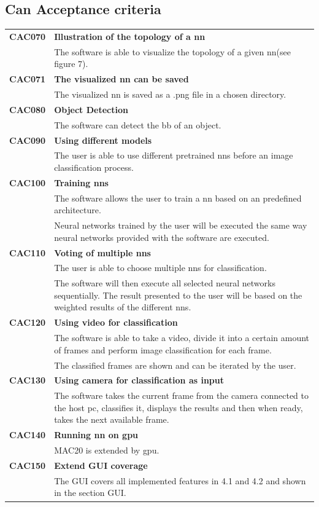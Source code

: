 \documentclass[parskip=full]{scrartcl}
\begin{document}
\subsection{Can Acceptance criteria}
\begin{tabular}{p{2cm}p{12cm}}
\textbf{CAC070} & \textbf{Illustration of the topology of a \gls{nn}} \\
& The software is able to visualize the topology of a given \gls{nn}(see figure 7). \\
\textbf{CAC071} & \textbf{The visualized nn can be saved}\\
& The visualized \gls{nn} is saved as a .png file in a chosen directory.\\
\textbf{CAC080} & \textbf{Object Detection} \\
& The software can detect the \gls{bb} of an object. \\ 
\textbf{CAC090} &  \textbf{Using different models}\\
& The user is able to use different pretrained \glspl{nn} before an \gls{image classification} process. \\
\textbf{CAC100} & \textbf{Training \glspl{nn}} \\
& The software allows the user to train a \gls{nn} based on an predefined architecture.\\
& Neural networks trained by the user will be executed the same way neural networks provided with the software are executed.\\
\textbf{CAC110} & \textbf{Voting of multiple \glspl{nn}} \\
& The user is able to choose multiple \glspl{nn} for classification.\\
& The software will then execute all selected neural networks sequentially. The result presented to the user will be based on the weighted results of the different \glspl{nn}.\\
\textbf{CAC120} & \textbf{Using video for classification} \\
& The software is able to take a video, divide it into a certain amount of frames and perform \gls{image classification} for each frame.\\
& The classified frames are shown and can be iterated by the user. \\
\textbf{CAC130} & \textbf{Using camera for classification as input} \\
& The software takes the current frame from the camera connected to the \gls{host pc}, classifies it, displays the results and then when ready, takes the next available frame.\\
\textbf{CAC140} & \textbf{Running \gls{nn} on \gls{gpu}}\\
& MAC20 is extended by \gls{gpu}.\\
\textbf{CAC150} & \textbf{Extend GUI coverage}\\
& The GUI covers all implemented features in 4.1 and 4.2 and shown in the section GUI.
\end{tabular}
\end{document}
